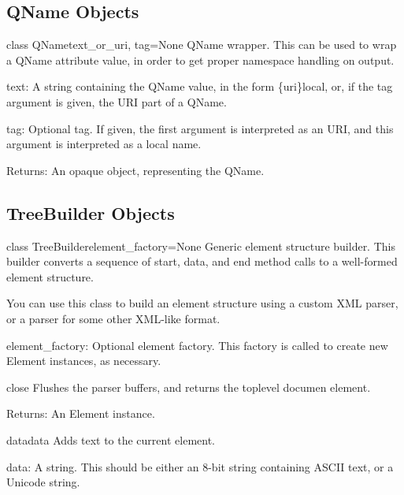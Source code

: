 \subsection{QName Objects\label{elementtree-qname-objects}}

\begin{classdesc}{class QName}{text_or_uri, tag=None}
QName wrapper.  This can be used to wrap a QName attribute value, in
order to get proper namespace handling on output.

text: A string containing the QName value, in the form {\{}uri{\}}local,
or, if the tag argument is given, the URI part of a QName.

tag: Optional tag.  If given, the first argument is interpreted as
an URI, and this argument is interpreted as a local name.

Returns: An opaque object, representing the QName.
\end{classdesc}


\subsection{TreeBuilder Objects\label{elementtree-treebuilder-objects}}

\begin{classdesc}{class TreeBuilder}{element_factory=None}
Generic element structure builder.  This builder converts a sequence
of start, data, and end method calls to a well-formed element structure.

You can use this class to build an element structure using a custom XML
parser, or a parser for some other XML-like format.

element{\_}factory: Optional element factory.  This factory
is called to create new Element instances, as necessary.
\end{classdesc}

\begin{methoddesc}{close}{}
Flushes the parser buffers, and returns the toplevel documen
element.

\begin{datadescni}{Returns:}
An Element instance.
\end{datadescni}
\end{methoddesc}

\begin{methoddesc}{data}{data}
Adds text to the current element.

data: A string.  This should be either an 8-bit string
containing ASCII text, or a Unicode string.
\end{methoddesc}

